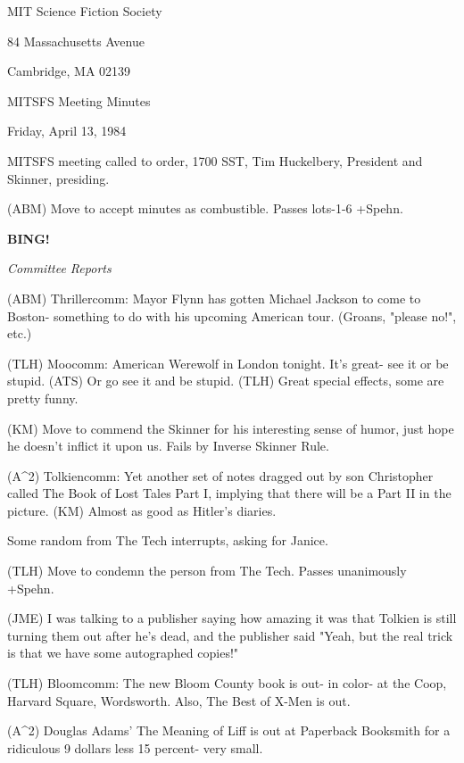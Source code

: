 \documentclass[12pt]{article}
\newcommand{\bing}{{\bf BING!} }
\newcommand{\goto}[1]{\bing \vskip 12pt \centerline{{\em{#1}}}}
\begin{document}
\begin{center}

MIT Science Fiction Society 

84 Massachusetts Avenue

Cambridge, MA 02139

\vspace{12pt}

MITSFS Meeting Minutes 

Friday, April 13, 1984

\end{center}
 
\vspace{18pt}

\setlength{\parskip}{6pt}

\noindent
MITSFS meeting called to order, 1700 SST,
Tim Huckelbery, President and Skinner, presiding.

(ABM) Move to accept minutes as combustible. Passes lots-1-6 +Spehn.

\goto{Committee Reports}

(ABM) Thrillercomm: Mayor Flynn has gotten Michael Jackson to come to Boston- something to do with his upcoming American tour. (Groans, "please no!", etc.)

(TLH) Moocomm: American Werewolf in London tonight. It's great- see it or be stupid. (ATS) Or go see it and be stupid. (TLH) Great special effects, some are pretty funny.

(KM) Move to commend the Skinner for his interesting sense of humor, just hope he doesn't inflict it upon us. Fails by Inverse Skinner Rule.

(A^2) Tolkiencomm: Yet another set of notes dragged out by son Christopher called The Book of Lost Tales Part I, implying that there will be a Part II in the picture. (KM) Almost as good as Hitler's diaries.

Some random from The Tech interrupts, asking for Janice.

(TLH) Move to condemn the person from The Tech. Passes unanimously +Spehn.

(JME) I was talking to a publisher saying how amazing it was that Tolkien is still turning them out after he's dead, and the publisher said "Yeah, but the real trick is that we have some autographed copies!"

(TLH) Bloomcomm: The new Bloom County book is out- in color- at the Coop, Harvard Square, Wordsworth. Also, The Best of X-Men is out.

(A^2) Douglas Adams' The Meaning of Liff is out at Paperback Booksmith for a ridiculous 9 dollars less 15 percent- very small.
\end{document}
